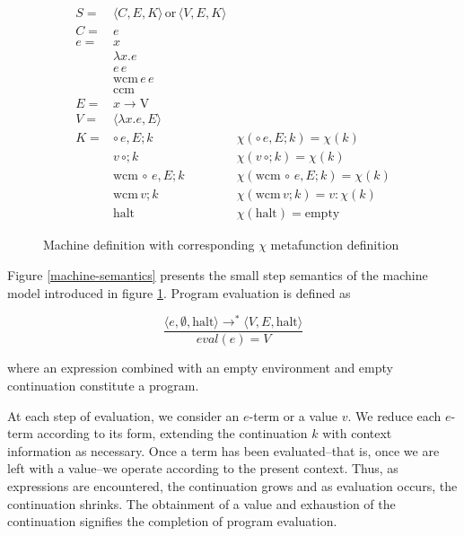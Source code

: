 \documentclass[ms]{byuprop}
\newcounter{definition}
\begin{document}
\begin{figure}
\begin{align*}
S= & \langle C,E,K\rangle\,\mathrm{or}\,\langle V,E,K\rangle\\
C= & e\\
e= & x\\
   & \lambda x.e\\
   & e\,e\\
   & \mathrm{wcm}\,e\,e\\
   & \mathrm{ccm}\\
E= & x\rightarrow\mathrm{V}\\
V= & \langle\lambda x.e,E\rangle\\
K= & \circ\,e,E;k               & \chi(\circ\,e,E;k)=\chi(k)\\
   & v\,\circ;k                 & \chi(v\,\circ;k)=\chi(k)\\
   & \mathrm{wcm}\,\circ\,e,E;k & \chi(\mathrm{wcm}\,\circ\,e,E;k)=\chi(k)\\
   & \mathrm{wcm}\,v; k           & \chi(\mathrm{wcm}\,v; k)=v:\chi(k)\\
   & \mathrm{halt}                & \chi(\mathrm{halt})=\mathrm{empty}
\end{align*}
\caption{Machine definition with corresponding $\chi$ metafunction definition}
\label{machine-definition}
\end{figure}

Figure \ref{machine-semantics} presents the small step semantics of the machine model 
introduced in figure \ref{machine-definition}. Program evaluation is defined as

\[
\frac{\langle e,\emptyset,\mathrm{halt}\rangle\rightarrow^{*}\langle V,E,\mathrm{halt}\rangle}{eval(e)=V}
\]

where an expression combined with an empty environment and empty continuation constitute 
a program.

At each step of evaluation, we consider an $e$-term or a value $v$. We reduce each $e$-term 
according to its form, extending the continuation $k$ with context information as necessary. 
Once a term has been evaluated--that is, once we are left with a value--we operate according 
to the present context. Thus, as expressions are encountered, the continuation grows and as 
evaluation occurs, the continuation shrinks. The obtainment of a value and exhaustion of the 
continuation signifies the completion of program evaluation.
\end{document}
